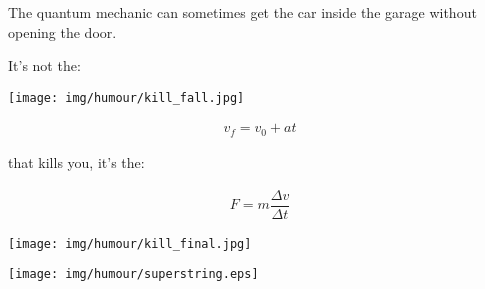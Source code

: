 	The quantum mechanic can sometimes get the car inside the garage without opening the door.
	
	\begin{center}\underline{\hspace{5 cm}}\end{center}
	
	\begin{center}
	It's not the:
	
	\texttt{[image: img/humour/kill\_fall.jpg]}
	\end{center}
	\begin{gather*}
		v_f=v_0+at
	\end{gather*}
	\begin{center}
	that kills you, it's the:
	\end{center}
	\begin{gather*}
		F=m\dfrac{\Delta v}{\Delta t}
	\end{gather*}
	\begin{center}
	\texttt{[image: img/humour/kill\_final.jpg]}
	\end{center}
	

	\begin{center}
	\texttt{[image: img/humour/superstring.eps]}
	\end{center}
\begin{center}\underline{\hspace{5 cm}}\end{center}
	
